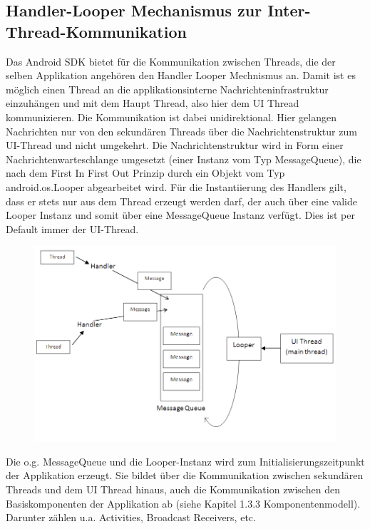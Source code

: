 \documentclass[12pt,oneside,a4paper,bibtotoc,liststotoc]{scrreprt}
\begin{document}
\subsection{Handler-Looper Mechanismus zur Inter-Thread-Kommunikation}
Das Android SDK bietet für die Kommunikation zwischen Threads, die der selben Applikation angehören den Handler Looper Mechnismus an. Damit ist es möglich einen Thread an die applikationsinterne Nachrichteninfrastruktur einzuhängen und mit dem Haupt Thread, also hier dem UI Thread kommunizieren. Die Kommunikation ist dabei unidirektional. Hier gelangen Nachrichten nur von den sekundären Threads über die Nachrichtenstruktur zum UI-Thread und nicht umgekehrt. Die Nachrichtenstruktur wird in Form einer Nachrichtenwarteschlange umgesetzt (einer Instanz vom Typ MessageQueue), die nach dem First In First Out Prinzip durch ein Objekt vom Typ android.os.Looper abgearbeitet wird. Für die Instantiierung des Handlers gilt, dass er stets nur aus dem Thread erzeugt werden darf, der auch über eine valide Looper Instanz und somit über eine MessageQueue Instanz verfügt. Dies ist per Default immer der UI-Thread.
\begin{figure}[H]
  \begin{centering}
    \includegraphics[width=1\textwidth]{img/handler_looper.png}
    \label{handler_looper}
  \end{centering}
\end{figure}
Die o.g. MessageQueue und die Looper-Instanz wird zum Initialisierungszeitpunkt der Applikation erzeugt. Sie bildet über die Kommunikation zwischen sekundären Threads und dem UI Thread hinaus, auch die Kommunikation zwischen den Basiskomponenten der Applikation ab (siehe Kapitel 1.3.3 Komponentenmodell). Darunter zählen u.a. Activities, Broadcast Receivers, etc.
\end{document}
